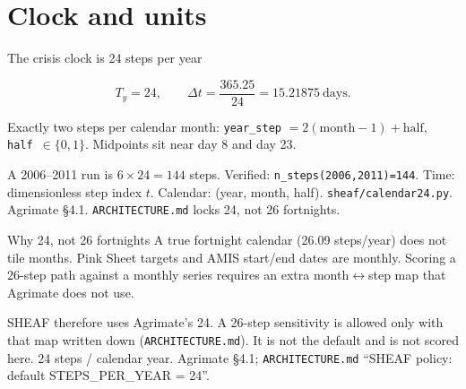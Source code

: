 \section{Clock and units}

\begin{frame}{The crisis clock is 24 steps per year}

\[
T_y = 24, \qquad \Delta t = \frac{365.25}{24} = 15.21875~\text{days}.
\]

Exactly two steps per calendar month: \texttt{year\_step} $= 2(\mathrm{month}-1)+\mathrm{half}$,
\texttt{half}\ $\in\{0,1\}$. Midpoints sit near day 8 and day 23.

A 2006--2011 run is $6\times 24 = 144$ steps. Verified:
\texttt{n\_steps(2006,2011)=144}.
{Time: dimensionless step index $t$. Calendar: (year, month, half).}
{\texttt{sheaf/calendar24.py}. Agrimate \citep{kuhla2025} \S4.1.
\texttt{ARCHITECTURE.md} locks 24, not 26 fortnights.}
\end{frame}

\begin{frame}{Why 24, not 26 fortnights}
A true fortnight calendar (26.09 steps/year) does not tile months. Pink
Sheet targets and AMIS start/end dates are monthly. Scoring a 26-step path
against a monthly series requires an extra month$\leftrightarrow$step map
that Agrimate does not use.

SHEAF therefore uses Agrimate's 24. A 26-step sensitivity is allowed only
with that map written down (\texttt{ARCHITECTURE.md}). It is not the
default and is not scored here.
{24 steps / calendar year.}
{Agrimate \S4.1; \texttt{ARCHITECTURE.md} ``SHEAF policy: default
STEPS\_PER\_YEAR = 24''.}
\end{frame}

